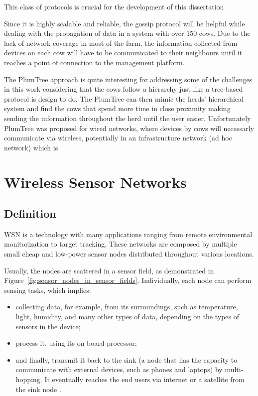 This class of protocols is crucial for the development of this dissertation %

Since it is highly scalable and reliable, the gossip protocol will be helpful while dealing
with the propagation of data in a system with over 150 cows. Due to the lack of network
coverage in most of the farm, the information collected from devices on each cow will have to
be communicated to their neighbours until it reaches a point of connection to the management
platform.

The PlumTree approach is quite interesting for addressing some of the challenges in this work
considering that the cows follow a hierarchy just like a tree-based protocol is design to do.
The PlumTree can then mimic the herds' hierarchical system and find the cows that spend more
time in close proximity making sending the information throughout the herd until the user
easier. Unfortunately PlumTree was proposed for wired networks, where devices %
by cows will necessarly communicate via wireless, potentially in an infrastructure %
network (ad hoc network) which is %


\section{Wireless Sensor Networks}
\label{sec:wireless_sensor_networks}

\subsection{Definition}
\label{subsec:wsn_definition}
\Gls{WSN} is a technology with many applications ranging from remote environmental monitorization
to target tracking. These networks are composed by multiple small cheap and low-power sensor
nodes distributed throughout various locations.

Usually, the nodes are scattered in a sensor field, as demonstrated in Figure~\ref{fig:sensor_nodes_in_sensor_fields}.
Individually, each node can perform sensing tasks, which implies:
\begin{itemize}
      \item collecting data, for example, from its surroundings, such as temperature, light,
            humidity, and many other types of data, depending on the types of sensors in the
            device;
      \item process it, using its on-board processor;
      \item and finally, transmit it back to the sink (a node that has the capacity to communicate
            with external devices, such as phones and laptops) by multi-hopping. It eventually
            reaches the end users via internet or a satellite from the %
            sink node \cite{Akyildiz2002}.
\end{itemize}

